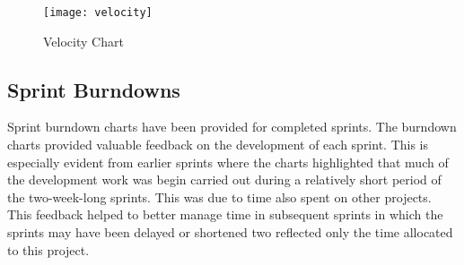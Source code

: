   \begin{figure}[H]
    \setlength{\belowcaptionskip}{15pt plus 3pt minus 2pt}
    \caption{Velocity Chart}
    \centering
    \texttt{[image: velocity]}
    \label{fig:velocity}
  \end{figure}

	\subsection{Sprint Burndowns}
  Sprint burndown charts have been provided for completed sprints. The burndown charts provided valuable feedback on the development of each sprint. This is especially evident from earlier sprints where the charts highlighted that much of the development work was begin carried out during a relatively short period of the two-week-long sprints. This was due to time also spent on other projects. This feedback helped to better manage time in subsequent sprints in which the sprints may have been delayed or shortened two reflected only the time allocated to this project.